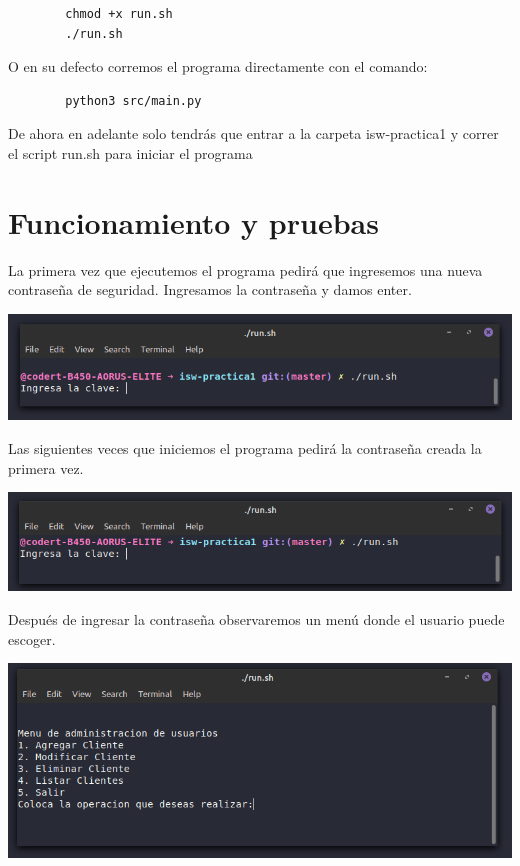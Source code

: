 \documentclass[12pt]{article}
\begin{document}
		\begin{lstlisting}
		chmod +x run.sh
		./run.sh
		\end{lstlisting}
		O en su defecto corremos el programa directamente con el comando:
		\begin{lstlisting}
		python3 src/main.py
		\end{lstlisting}
		
		De ahora en adelante solo tendrás que entrar a la carpeta isw-practica1 y correr el script run.sh para iniciar el programa
		
	\newpage	
	
	\section{Funcionamiento y pruebas}
	
		La primera vez que ejecutemos el programa pedirá que ingresemos una nueva contraseña de seguridad. Ingresamos la contraseña y damos enter.
	
		\includegraphics[scale=0.7]{cap1}\newline

		Las siguientes veces que iniciemos el programa pedirá la contraseña creada la primera vez.
	
		\includegraphics[scale=0.7]{cap2}\newline

		Después de ingresar la contraseña observaremos un menú donde el usuario puede escoger.
	
		\includegraphics[scale=0.7]{cap3}
	
\end{document}

